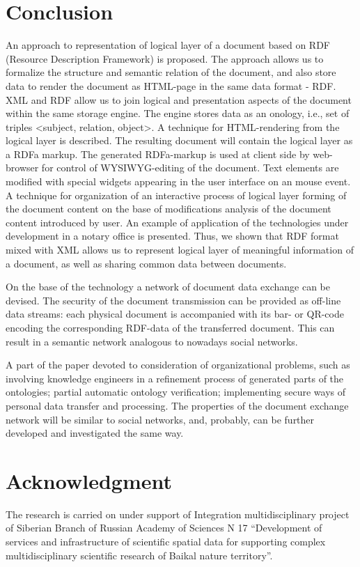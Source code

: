 \documentclass[conference]{IEEEtran}
\begin{document}
\section{Conclusion}
An approach to representation of logical layer of a document based on RDF (Resource Description Framework) is proposed. The approach allows us to formalize the structure and semantic relation of the document, and also store data to render the document as HTML-page in the same data format - RDF. XML and RDF allow us to join logical and presentation aspects of the document within the same storage engine. The engine stores data as an onology, i.e., set of triples <subject, relation, object>. A technique for HTML-rendering from the logical layer is described. The resulting document will contain the logical layer as a RDFa markup. The generated RDFa-markup is used at client side by web-browser for control of WYSIWYG-editing of the document. Text elements are modified with special widgets appearing in the user interface on an mouse event. A technique for organization of an interactive process of logical layer forming of the document content on the base of modifications analysis of the document content introduced by user. An example of application of the technologies under development in a notary office is presented. Thus, we shown that RDF format mixed with XML allows us to represent logical layer of meaningful information of a document, as well as sharing common data between documents.

On the base of the technology a network of document data exchange can be devised. The security of the document transmission can be provided as off-line data streams: each physical document is accompanied with its bar- or QR-code encoding the corresponding RDF-data of the transferred document. This can result in a semantic network analogous to nowadays social networks.

A part of the paper devoted to consideration of organizational problems, such as involving knowledge engineers in a refinement process of generated parts of the ontologies; partial automatic ontology verification; implementing secure ways of personal data transfer and processing. The properties of the document exchange network will be similar to social networks, and, probably, can be further developed and investigated the same way.





\section*{Acknowledgment}
The research is carried on under support of Integration multidisciplinary project of Siberian Branch of Russian Academy of Sciences N 17 “Development of services and infrastructure of scientific spatial data for supporting complex multidisciplinary scientific research of Baikal nature territory”.
\end{document}
